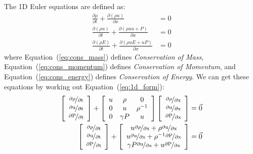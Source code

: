 \documentclass[addpoints]{exam}
\begin{document}
\begin{questions}
\begin{solution}
The 1D Euler equations are defined as:
\begin{align}
\frac{\partial \rho}{\partial t} + \frac{\partial (\rho u)}{\partial x} &= 0\label{eq:cons_mass}\\
\frac{\partial (\rho u)}{\partial t} + \frac{\partial (\rho uu + P)}{\partial x} &= 0\label{eq:cons_momentum}\\
\frac{\partial (\rho E)}{\partial t} + \frac{\partial (\rho u E + u P)}{\partial x} &= 0\label{eq:cons_energy}
\end{align}
where Equation~(\ref{eq:cons_mass}) defines {\em Conservation of Mass}, Equation~(\ref{eq:cons_momentum}) defines {\em Conservation of Momentum}, and Equation~(\ref{eq:cons_energy}) defines {\em Conservation of Energy}. We can get these equations by working out Equation~(\ref{eq:1d_form}):
\begin{align}
\left[\begin{array}{c}\unitfrac{\partial \rho}{\partial t}\\ \unitfrac{\partial u}{\partial t}\\ \unitfrac{\partial P}{\partial t}\end{array}\right]+\left[\begin{array}{c c c}u & \rho & 0\\ 0 & u & \rho^{-1}\\ 0 & \gamma P & u\end{array}\right] \left[\begin{array}{c}\unitfrac{\partial \rho}{\partial x}\\ \unitfrac{\partial u}{\partial x}\\ \unitfrac{\partial P}{\partial x}\end{array}\right] &= \vec{0}\\
\left[\begin{array}{c}\unitfrac{\partial \rho}{\partial t}\\ \unitfrac{\partial u}{\partial t}\\ \unitfrac{\partial P}{\partial t}\end{array}\right] + \left[\begin{array}{c}u\unitfrac{\partial \rho}{\partial x} + \rho\unitfrac{\partial u}{\partial x}\\ u\unitfrac{\partial u}{\partial x} + \rho^{-1}\unitfrac{\partial P}{\partial x}\\ \gamma P\unitfrac{\partial u}{\partial x} + u\unitfrac{\partial P}{\partial x}\end{array} \right] &= \vec{0}\\

\end{align}
\end{solution}
\end{questions}
\end{document}
